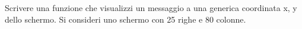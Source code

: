  Scrivere una funzione che visualizzi un messaggio a una generica coordinata x, y dello schermo. Si consideri uno schermo con 25 righe e 80 colonne.
